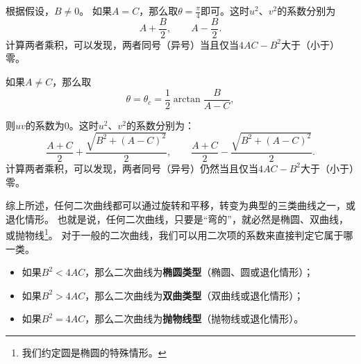 \documentclass[12pt,UTF8]{ctexbook}
\theoremstyle{definition}
\theoremstyle{plain}
\begin{document}
根据假设，$B\neq 0$。
如果$A = C$，那么取$\theta = \frac{\pi}{4}$即可。这时$u^2$、$v^2$的系数分别为
$$ A + \frac{B}{2}, \qquad A - \frac{B}{2}. $$
计算两者乘积，可以发现，两者同号（异号）当且仅当$4AC - B^2$大于（小于）零。

如果$A\neq C$，那么取
$$\theta = \theta_c = \frac{1}{2} \arctan{\frac{B}{A - C}},$$



则$uv$的系数为$0$。这时$u^2$、$v^2$的系数分别为：
$$ \frac{A+C}{2} + \frac{\sqrt{B^2 + (A - C)^2}}{2}, \qquad \frac{A+C}{2} - \frac{\sqrt{B^2 + (A - C)^2}}{2}. $$
计算两者乘积，可以发现，两者同号（异号）仍然当且仅当$4AC - B^2$大于（小于）零。

综上所述，任何二次曲线都可以通过旋转和平移，转变为典型的三类曲线之一，或退化情形。
也就是说，任何二次曲线，只要是“弯的”，就必然是椭圆、双曲线，或抛物线\footnote{我们约定圆是椭圆的特殊情形。}。
对于一般的二次曲线，我们可以用二次项的系数来直接判定它属于哪一类。
\begin{itemize}
    \item 如果$B^2<4AC$，那么二次曲线为\textbf{椭圆类型}（椭圆、圆或退化情形）；
    \item 如果$B^2>4AC$，那么二次曲线为\textbf{双曲类型}（双曲线或退化情形）；
    \item 如果$B^2=4AC$，那么二次曲线为\textbf{抛物线型}（抛物线或退化情形）。
\end{itemize}
\end{document}

